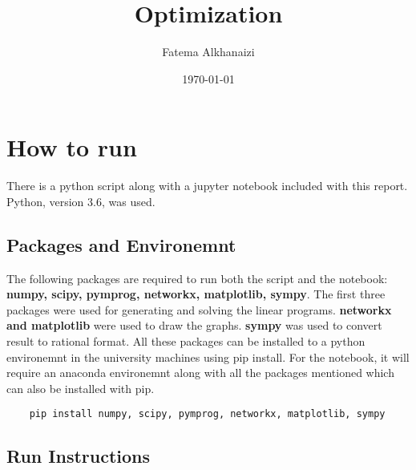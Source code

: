 \documentclass[11pt]{article}
\title{Optimization}
\author{Fatema Alkhanaizi}
\date{\today}
\begin{document}
    \maketitle
    \section*{How to run}
    There is a python script along with a jupyter notebook included with this report. Python, version 3.6, was used. 
    \subsection*{Packages and Environemnt}
    The following packages are required to run both the script and the notebook: \textbf{numpy, scipy, pymprog, networkx, matplotlib, sympy}. The first three packages were used for generating and solving the linear programs. \textbf{networkx and matplotlib} were used to draw the graphs. \textbf{sympy} was used to convert result to rational format.   
    All these packages can be installed to a python environemnt in the university machines using pip install. For the notebook, it will require an anaconda environemnt along with all the packages mentioned which can also be installed with pip. 
    \begin{lstlisting}
    pip install numpy, scipy, pymprog, networkx, matplotlib, sympy
    \end{lstlisting}
    \subsection*{Run Instructions}
\end{document}
